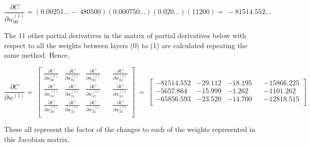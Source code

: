 \documentclass[12pt,a4paper]{article}
\begin{document}
\begin{equation}
    \frac{\partial C}{\partial w_{00}^{\left(1\right)}} =\left(0.00251...-\ 480500\right)\left(0.000750...\right)\left(0.020...\right)\left(11200\right)=\ -81514.552...
\end{equation}

The 11 other partial derivatives in the matrix of partial derivatives below with respect to all the weights between layers (0) to (1) are calculated repeating the same method. Hence,

\begin{equation}
\frac{\partial C}{\partial w^{\left(1\right)}}=\ \left[\begin{matrix}\frac{\partial C}{\partial w_{00}^{\left(1\right)}}&\frac{\partial C}{\partial w_{01}^{\left(1\right)}}&\frac{\partial C}{\partial w_{02}^{\left(1\right)}}\\\frac{\partial C}{\partial w_{10}^{\left(1\right)}}&\frac{\partial C}{\partial w_{11}^{\left(1\right)}}&\frac{\partial C}{\partial w_{12}^{\left(1\right)}}\\\frac{\partial C}{\partial w_{20}^{\left(1\right)}}&\frac{\partial C}{\partial w_{21}^{\left(1\right)}}&\frac{\partial C}{\partial w_{22}^{\left(1\right)}}\\\end{matrix}\ \ \ \ \begin{matrix}\frac{\partial C}{\partial w_{03}^{\left(1\right)}}\\\frac{\partial C}{\partial w_{13}^{\left(1\right)}}\\\frac{\partial C}{\partial w_{23}^{\left(1\right)}}\\\end{matrix}\right]\ =\ \left[\begin{matrix}-81514.552&-29.112&-18.195\\-5657.864&-15.999&-1.262\\-65856.593&-23.520&-14.700\\\end{matrix}\ \ \ \ \begin{matrix}-15866.225\\-1101.262\\-12818.515\\\end{matrix}\right]
\end{equation}


These all represent the factor of the changes to each of the weights represented in this Jacobian matrix.

\hspace{}
\end{document}
